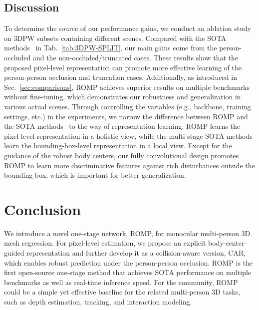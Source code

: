 \documentclass[10pt,twocolumn,letterpaper]{article}
\begin{document}
\subsection{Discussion}
\vspace{-2mm}
To determine the source of our performance gains, we conduct an ablation study on 3DPW subsets containing different scenes. 
Compared with the SOTA methods~\cite{jiang2020coherent,kocabas2020vibe} in Tab.~\ref{tab:3DPW-SPLIT}, our main gains come from the person-occluded and the non-occluded/truncated cases. 
These results show that the proposed pixel-level representation can promote more effective learning of the person-person occlusion and truncation cases.
Additionally, as introduced in Sec.~\ref{sec:comparisons}, ROMP achieves superior results on multiple benchmarks without fine-tuning, which demonstrates our robustness and generalization in various actual scenes.
Through controlling the variables (e.g., backbone, training settings, etc.) in the experiments, we narrow the difference between ROMP and the SOTA methods~\cite{jiang2020coherent,kocabas2020vibe,kolotouros2019spin} to the way of representation learning.
ROMP learns the pixel-level representation in a holistic view, while the multi-stage SOTA methods learn the bounding-box-level representation in a local view.
Except for the guidance of the robust body centers, our fully convolutional design promotes ROMP to learn more discriminative features against rich disturbances outside the bounding box, which is important for better generalization. 

\vspace{-2mm}
\section{Conclusion}
\vspace{-2mm}
We introduce a novel one-stage network, ROMP, for monocular multi-person 3D mesh regression. 
For pixel-level estimation, we propose an explicit body-center-guided representation and further develop it as a collision-aware version, CAR, which enables robust prediction under the person-person occlusion. 
ROMP is the first open-source one-stage method that achieves SOTA performance on multiple benchmarks as well as real-time inference speed.
For the community, ROMP could be a simple yet effective baseline for the related multi-person 3D tasks, such as depth estimation, tracking, and interaction modeling. 


{\small


}
\end{document}

